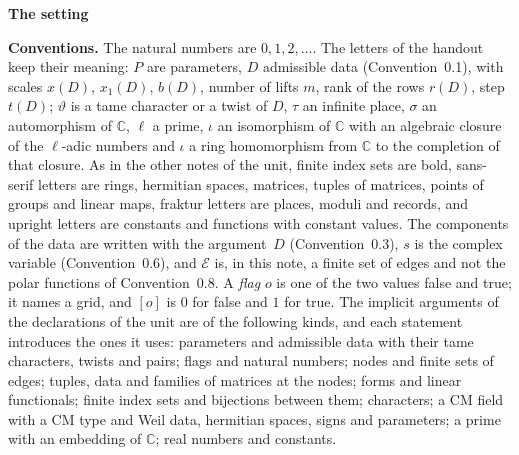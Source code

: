 \documentclass[11pt,a4paper]{article}
\newcommand{\kw}[1]{\emph{#1}}
\newcommand{\sect}[2]{\refstepcounter{section}\label{#2}\par\addvspace{19pt plus 4pt minus 2pt}\Needspace{7\baselineskip}%
  \noindent\llap{{\fontsize{13.2}{16}\selectfont\bfseries\color{inkfaint}\thesection}\hspace{9pt}}%
  {\fontsize{13.2}{16}\selectfont\bfseries\color{ink}#1}\par\nopagebreak\vspace{-1pt}}
\theoremstyle{plainx}
\theoremstyle{uprightx}
\newenvironment{conventions}{\par\addvspace{5pt}\noindent\textbf{Conventions.}\enspace\ignorespaces}{\par\addvspace{3pt}}
\newcommand{\CC}{\mathbb{C}}
\newcommand{\cE}{\mathcal{E}}
\begin{document}
\sect{The setting}{s:setting}
\begin{conventions}\label{c:conventions}
The natural numbers are $0,1,2,\dots$. The letters of the handout keep their meaning: $P$ are parameters, $D$
admissible data (Convention~0.1), with scales $x(D)$, $x_1(D)$, $b(D)$, number of lifts $m$, rank of the rows $r(D)$, step $t(D)$; $\vartheta$
is a tame character or a twist of $D$, $\tau$ an infinite place, $\sigma$ an automorphism of $\CC$, $\ell$ a prime,
$\iota$ an isomorphism of $\CC$ with an algebraic closure of the $\ell$-adic numbers and $\iota$ a ring homomorphism from
$\CC$ to the completion of that closure. As in the other notes of the unit, finite index sets are bold,
sans-serif letters are rings, hermitian spaces, matrices, tuples of matrices, points of groups and linear maps,
fraktur letters are places, moduli and records, and upright letters are constants and functions with constant
values. The components of the data are written with the argument~$D$ (Convention~0.3), $s$ is the complex variable
(Convention~0.6), and $\cE$ is, in this note, a finite set of edges and not the polar functions of Convention~0.8. A \kw{flag} $o$ is one of the two values false and true; it names a grid, and $[o]$ is $0$ for false and
$1$ for true. The implicit arguments of the declarations of the unit are of the following kinds, and each
statement introduces the ones it uses: parameters and admissible data with their tame characters, twists and
pairs; flags and natural numbers; nodes and finite sets of edges; tuples, data and families of matrices at the
nodes; forms and linear functionals; finite index sets and bijections between them; characters; a CM field with a
CM type and Weil data, hermitian spaces, signs and parameters; a prime with an embedding of $\CC$; real numbers
and constants.
\end{conventions}
\end{document}
